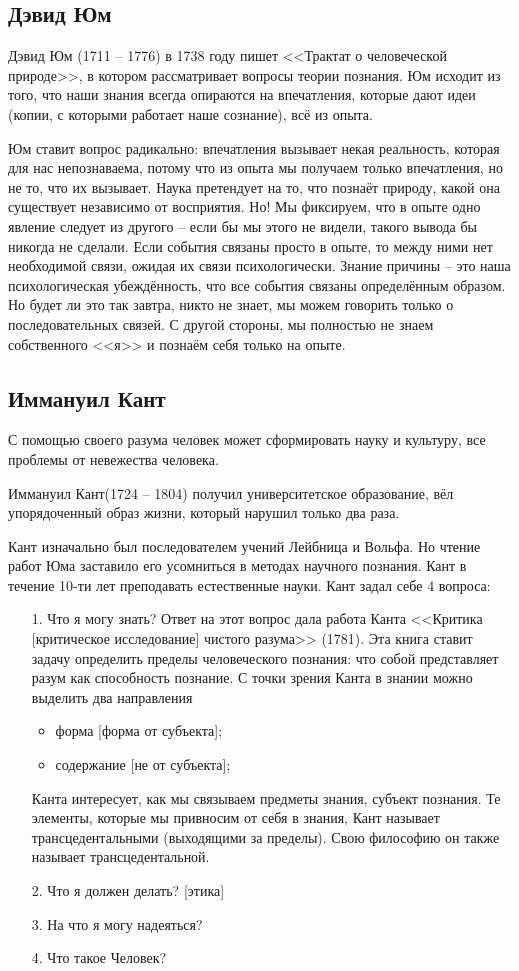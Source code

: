 \documentclass[a4paper, 12pt]{book} %
\begin{document}
\subsection{Дэвид Юм}
Дэвид Юм (1711 -- 1776) в 1738 году пишет <<Трактат о человеческой природе>>, в котором рассматривает вопросы теории познания. Юм исходит из того, что наши знания всегда опираются на впечатления, которые дают идеи (копии, с которыми работает наше сознание), всё из опыта.

Юм ставит вопрос радикально: впечатления вызывает некая реальность, которая для нас непознаваема, потому что из опыта мы получаем только впечатления, но не то, что их вызывает. Наука претендует на то, что познаёт природу, какой она существует независимо от восприятия.
Но! Мы фиксируем, что в опыте одно явление следует из другого -- если бы мы этого не видели, такого вывода бы никогда не сделали. Если события связаны просто в опыте, то между ними нет необходимой связи, ожидая их связи психологически. Знание причины -- это наша психологическая убеждённость, что все события связаны определённым образом. Но будет ли это так завтра, никто не знает, мы можем говорить только о последовательных связей. С другой стороны, мы полностью не знаем собственного <<я>> и познаём себя только на опыте.

\subsection{Иммануил Кант}

С помощью своего разума человек может сформировать науку и 
культуру, все проблемы от невежества человека.

Иммануил Кант(1724 -- 1804) получил университетское образование, вёл упорядоченный образ жизни, который нарушил только два раза.

Кант изначально был последователем учений Лейбница и Вольфа. Но чтение работ Юма заставило его усомниться в методах научного познания. Кант в течение 10-ти лет преподавать естественные науки. Кант задал себе 4 вопроса:
\begin{itemize}
\item[1.] Что я могу знать?
Ответ на этот вопрос дала работа Канта <<Критика [критическое исследование] чистого разума>> (1781). Эта книга ставит задачу определить пределы человеческого познания: что собой представляет разум как способность познание. С точки зрения Канта в знании можно выделить два направления
\begin{itemize}
\item форма [форма от субъекта];
\item содержание [не от субъекта];
\end{itemize}
Канта интересует, как мы связываем предметы знания, субъект познания. Те элементы, которые мы привносим от себя в знания, Кант называет трансцедентальными (выходящими за пределы). Свою философию он также называет трансцедентальной.
\item[2.] Что я должен делать? [этика]
\item[3.] На что я могу надеяться?
\item[4.] Что такое Человек?
\end{itemize}
\end{document}
